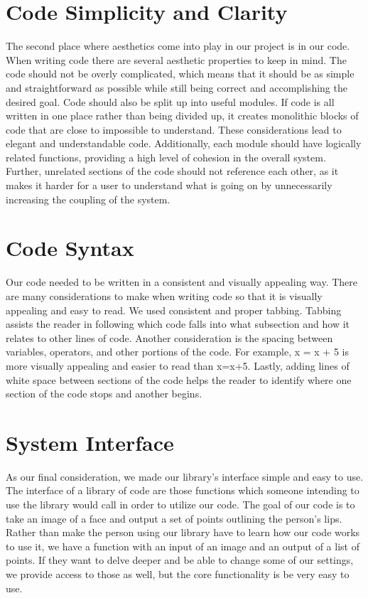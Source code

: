 \section{Code Simplicity and Clarity}
The second place where aesthetics come into play in our project is in our code. When writing code there are several aesthetic properties to keep in mind. The code should not be overly complicated, which means that it should be as simple and straightforward as possible while still being correct and accomplishing the desired goal. Code should also be split up into useful modules. If code is all written in one place rather than being divided up, it creates monolithic blocks of code that are close to impossible to understand. These considerations lead to elegant and understandable code. Additionally, each module should have logically related functions, providing a high level of cohesion in the overall system. Further, unrelated sections of the code should not reference each other, as it makes it harder for a user to understand what is going on by unnecessarily increasing the coupling of the system.

\section{Code Syntax}
Our code needed to be written in a consistent and visually appealing way. There are many considerations to make when writing code so that it is visually appealing and easy to read. We used consistent and proper tabbing. Tabbing assists the reader in following which code falls into what subsection and how it relates to other lines of code. Another consideration is the spacing between variables, operators, and other portions of the code. For example, x = x + 5 is more visually appealing and easier to read than x=x+5. Lastly, adding lines of white space between sections of the code helps the reader to identify where one section of the code stops and another begins.

\section{System Interface}
As our final consideration, we made our library's interface simple and easy to use. The interface of a library of code are those functions which someone intending to use the library would call in order to utilize our code. The goal of our code is to take an image of a face and output a set of points outlining the person's lips. Rather than make the person using our library have to learn how our code works to use it, we have a function with an input of an image and an output of a list of points. If they want to delve deeper and be able to change some of our settings, we provide access to those as well, but the core functionality is be very easy to use.
